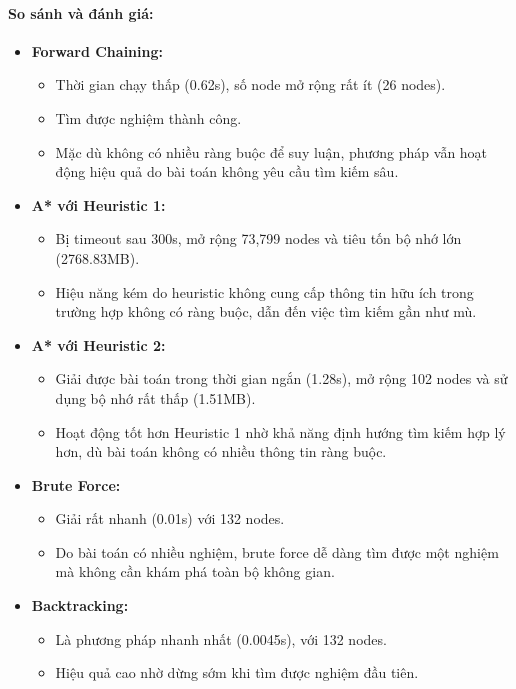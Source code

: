 \paragraph{So sánh và đánh giá:}

\begin{itemize}

\item \textbf{Forward Chaining:}
\begin{itemize}
    \item Thời gian chạy thấp (0.62s), số node mở rộng rất ít (26 nodes).
    \item Tìm được nghiệm thành công.
    \item Mặc dù không có nhiều ràng buộc để suy luận, phương pháp vẫn hoạt động hiệu quả do bài toán không yêu cầu tìm kiếm sâu.
\end{itemize}

\item \textbf{A* với Heuristic 1:}
\begin{itemize}
    \item Bị timeout sau 300s, mở rộng 73,799 nodes và tiêu tốn bộ nhớ lớn (2768.83MB).
    \item Hiệu năng kém do heuristic không cung cấp thông tin hữu ích trong trường hợp không có ràng buộc, dẫn đến việc tìm kiếm gần như mù.
\end{itemize}

\item \textbf{A* với Heuristic 2:}
\begin{itemize}
    \item Giải được bài toán trong thời gian ngắn (1.28s), mở rộng 102 nodes và sử dụng bộ nhớ rất thấp (1.51MB).
    \item Hoạt động tốt hơn Heuristic 1 nhờ khả năng định hướng tìm kiếm hợp lý hơn, dù bài toán không có nhiều thông tin ràng buộc.
\end{itemize}

\item \textbf{Brute Force:}
\begin{itemize}
    \item Giải rất nhanh (0.01s) với 132 nodes.
    \item Do bài toán có nhiều nghiệm, brute force dễ dàng tìm được một nghiệm mà không cần khám phá toàn bộ không gian.
\end{itemize}

\item \textbf{Backtracking:}
\begin{itemize}
    \item Là phương pháp nhanh nhất (0.0045s), với 132 nodes.
    \item Hiệu quả cao nhờ dừng sớm khi tìm được nghiệm đầu tiên.
\end{itemize}

\end{itemize}

